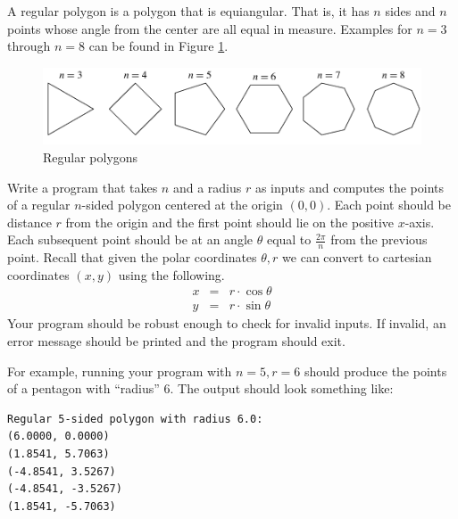 \begin{exer}
A regular polygon is a polygon that is equiangular.  That is, it has $n$ sides and $n$ points whose angle from the
center are all equal in measure.  Examples for $n = 3$ through $n = 8$ can be found in Figure \ref{fig:regularPolygons}.

\begin{figure}[h]
\centering
\includegraphics[scale=0.60]{images/regularPolygons}
%
\caption{Regular polygons}
\label{fig:regularPolygons}
\end{figure}

Write a program that takes $n$ and a radius $r$ as inputs and computes the points
of a regular $n$-sided polygon centered at the origin $(0,0)$.  Each point should be distance $r$
from the origin and the first point should lie on the positive $x$-axis.  Each subsequent point should be
at an angle $\theta$ equal to $\frac{2\pi}{n}$ from the previous point.  Recall that given the
polar coordinates $\theta, r$ we can convert to cartesian coordinates $(x, y)$ using the following.
$$\begin{array}{rcl}
 x & = & r \cdot \cos{\theta} \\
 y & = & r \cdot \sin{\theta}
\end{array}$$
Your program should be robust enough to check for invalid inputs.  If invalid, an error message should
be printed and the program should exit.

For example, running your program with $n = 5, r = 6$ should produce the points of a 
pentagon with ``radius'' $6$.  The output should look something like:

\begin{verbatim}
Regular 5-sided polygon with radius 6.0:
(6.0000, 0.0000)
(1.8541, 5.7063)
(-4.8541, 3.5267)
(-4.8541, -3.5267)
(1.8541, -5.7063)
\end{verbatim}

\end{exer}


